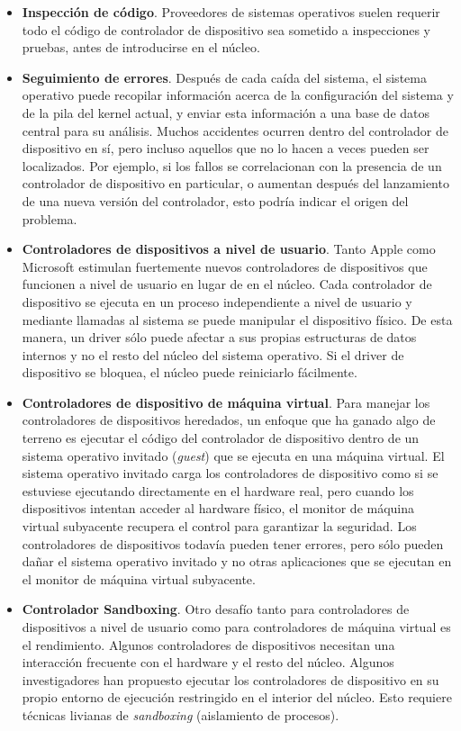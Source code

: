 \documentclass[10pt]{book}
\begin{document}
\begin{itemize}
\item \textbf{Inspección de código}. Proveedores de sistemas operativos suelen requerir todo el código de controlador de dispositivo sea sometido a inspecciones y pruebas, antes de introducirse en el núcleo.
\item \textbf{Seguimiento de errores}. Después de cada caída del sistema, el sistema operativo puede recopilar información acerca de la configuración del sistema y de la pila del kernel actual, y enviar esta información a una base de datos central para su análisis. Muchos accidentes ocurren dentro del controlador de dispositivo en sí, pero incluso aquellos que no lo hacen a veces pueden ser localizados. Por ejemplo, si los fallos se correlacionan con la presencia de un controlador de dispositivo en particular, o aumentan después del lanzamiento de una nueva versión del controlador, esto podría indicar el origen del problema.
\item \textbf{Controladores de dispositivos a nivel de usuario}. Tanto Apple como Microsoft estimulan fuertemente nuevos controladores de dispositivos que funcionen a nivel de usuario en lugar de en el núcleo. Cada controlador de dispositivo se ejecuta en un proceso independiente a nivel de usuario y mediante llamadas al sistema se puede manipular el dispositivo físico. De esta manera, un driver sólo puede afectar a sus propias estructuras de datos internos y no el resto del núcleo del sistema operativo. Si el driver de dispositivo se bloquea, el núcleo puede reiniciarlo fácilmente.
\item \textbf{Controladores de dispositivo de máquina virtual}. Para manejar los controladores de dispositivos heredados, un enfoque que ha ganado algo de terreno es ejecutar el código del controlador de dispositivo dentro de un sistema operativo invitado (\textit{guest}) que se ejecuta en una máquina virtual. El sistema operativo invitado carga los controladores de dispositivo como si se estuviese ejecutando directamente en el hardware real, pero cuando los dispositivos intentan acceder al hardware físico, el monitor de máquina virtual subyacente recupera el control para garantizar la seguridad. Los controladores de dispositivos todavía pueden tener errores, pero sólo pueden dañar el sistema operativo invitado y no otras aplicaciones que se ejecutan en el monitor de máquina virtual subyacente.

\item \textbf{Controlador Sandboxing}. Otro desafío tanto para controladores de dispositivos a nivel de usuario como para controladores de máquina virtual es el rendimiento. Algunos controladores de dispositivos necesitan una interacción frecuente con el hardware y el resto del núcleo. Algunos investigadores han propuesto ejecutar los controladores de dispositivo en su propio entorno de ejecución restringido en el interior del núcleo. Esto requiere técnicas livianas de \textit{sandboxing} (aislamiento de procesos).
\end{itemize}
\end{document}

